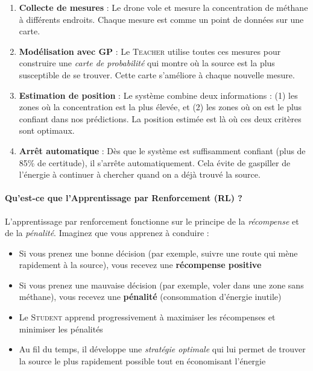 \documentclass[12pt,a4paper]{article}
\newcommand{\teacher}{\textsc{Teacher}}
\newcommand{\student}{\textsc{Student}}
\newcommand{\gp}{\textsc{GP}}
\newcommand{\rl}{\textsc{RL}}
\begin{document}
\begin{enumerate}
    \item \textbf{Collecte de mesures} : Le drone vole et mesure la concentration de méthane à différents endroits. Chaque mesure est comme un point de données sur une carte.
    
    \item \textbf{Modélisation avec \gp{}} : Le \teacher{} utilise toutes ces mesures pour construire une \textit{carte de probabilité} qui montre où la source est la plus susceptible de se trouver. Cette carte s'améliore à chaque nouvelle mesure.
    
    \item \textbf{Estimation de position} : Le système combine deux informations : (1) les zones où la concentration est la plus élevée, et (2) les zones où on est le plus confiant dans nos prédictions. La position estimée est là où ces deux critères sont optimaux.
    
    \item \textbf{Arrêt automatique} : Dès que le système est suffisamment confiant (plus de 85\% de certitude), il s'arrête automatiquement. Cela évite de gaspiller de l'énergie à continuer à chercher quand on a déjà trouvé la source.
\end{enumerate}

\paragraph{Qu'est-ce que l'Apprentissage par Renforcement (\rl{}) ?}

L'apprentissage par renforcement fonctionne sur le principe de la \textit{récompense} et de la \textit{pénalité}. Imaginez que vous apprenez à conduire :
\begin{itemize}
    \item Si vous prenez une bonne décision (par exemple, suivre une route qui mène rapidement à la source), vous recevez une \textbf{récompense positive}
    \item Si vous prenez une mauvaise décision (par exemple, voler dans une zone sans méthane), vous recevez une \textbf{pénalité} (consommation d'énergie inutile)
    \item Le \student{} apprend progressivement à maximiser les récompenses et minimiser les pénalités
    \item Au fil du temps, il développe une \textit{stratégie optimale} qui lui permet de trouver la source le plus rapidement possible tout en économisant l'énergie
\end{itemize}
\end{document}
